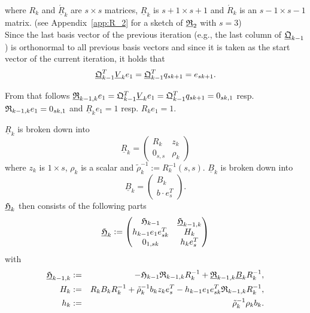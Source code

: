 \documentclass{scrartcl}
\numberwithin{equation}{section}
\begin{document}
where $R_k$ and $\underline{\acute{R}}_k$ are $s \times s$ matrices, $\underline{R}_k$ is $s + 1 \times s + 1$ and $\acute{R}_k$ is an $s - 1 \times s - 1$ matrix. (see Appendix~\ref{app:R_2} for a sketch of $\underline{\frak{R}}_2$ with $s = 3$)\\

Since the last basis vector of the previous iteration (e.g., the last column of $\underline{\frak{Q}}_{k - 1}$) is orthonormal to all previous basis vectors and since it is taken as the start vector of the current iteration, it holds that
\begin{equation*}
\underline{\frak{Q}}^T_{k - 1} \underline{V}_k e_1 = \underline{\frak{Q}}^T_{k - 1} q_{sk + 1} = e_{sk + 1}.
\end{equation*}

From that follows $\underline{\frak{R}}_{k - 1, k} e_1 = \frak{Q}^T_{k - 1} \underline{V}_k e_1 = \frak{Q}^T_{k - 1} q_{sk + 1} = 0_{sk, 1}$ resp. 
$\frak{R}_{k - 1, k} e_1 = 0_{sk, 1}$ and $\underline{R}_k e_1 = 1$ resp. $R_k e_1 = 1$.

$\underline{R}_k$ is broken down into
\begin{equation*}
\underline{R}_k = 
\begin{pmatrix}
	R_k & z_k\\
	0_{s, s} & \rho_k
\end{pmatrix}
\end{equation*}
where $z_k$ is $1 \times s$, $\rho_k$ is a scalar and $\tilde{\rho}^{-1}_k := R_k^{-1}(s,s)$. $\underline{B}_k$ is broken down into
\begin{equation*}
\underline{B}_k = 
\begin{pmatrix}
	B_k\\
	b \cdot e^T_s
\end{pmatrix}.
\end{equation*}
$\underline{\frak{H}}_k$ then consists of the following parts
\begin{equation}
\underline{\frak{H}}_k : = 
    	\begin{pmatrix}
    		\frak{H}_{k - 1} & \underline{\frak{H}}_{k - 1, k}\\
    		h_{k - 1} e_1 e_{sk}^T & H_k\\
    		0_{1,sk} & h_k e^T_s
    	\end{pmatrix}
\end{equation}
with
\begin{eqnarray} \label{eq:h_blackletter_k_}
\underline{\frak{H}}_{k - 1, k} &:=& -\frak{H}_{k - 1} \frak{R}_{k - 1, k} R^{-1}_k + \underline{\frak{R}}_{k - 1, k} \underline{B}_k R^{-1}_k,\\
H_k &:=& R_k B_k R^{-1}_k + \tilde{\rho}^{-1}_k b_k z_k e^T_s - h_{k-1} e_1 e^T_{sk} \frak{R}_{k-1,k} R^{-1}_k,\\
h_k &:=& \tilde{\rho}^{-1}_k \rho_k b_k.
\end{eqnarray}
\end{document}
